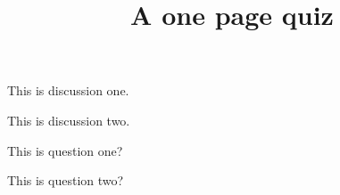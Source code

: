 \documentclass[one page]{webquiz}
\title{A one page quiz}
\begin{document}
  \begin{discussion}[One] This is discussion one. \end{discussion}
  \begin{discussion}[Two] This is discussion two. \end{discussion}
  \begin{question} This is question one?   \end{question}
  \begin{question} This is question two?   \end{question}
\end{document}
